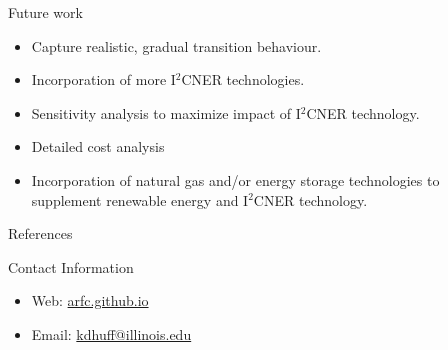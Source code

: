 \documentclass[final]{beamer}
\newlength{\onecolwid}
\newlength{\threecolwid}
\begin{document}
\begin{frame}[t]
\begin{columns}[t,totalwidth=\threecolwid]
\begin{column}{\onecolwid}
\begin{block}{Future work}
    \begin{itemize}
    
    \item Capture realistic, gradual transition behaviour.
    
    \item Incorporation of more I$^2$CNER technologies.
    
    \item Sensitivity analysis to maximize impact of I$^2$CNER technology.
    
    \item Detailed cost analysis
    
    \item Incorporation of natural gas and/or energy storage technologies to supplement renewable energy and I$^2$CNER technology. 
    
    \end{itemize}
\end{block}

\begin{block}{References}
        {\footnotesize 
        }
\end{block}




\begin{alertblock}{Contact Information}
\begin{itemize}
	\item Web: \href{arfc.github.io}{arfc.github.io}
	\item Email: \href{mailto:kdhuff@illinois.edu}{kdhuff@illinois.edu}
\end{itemize}

\end{alertblock}


\end{column}
\end{columns}
\end{frame}
\end{document}
